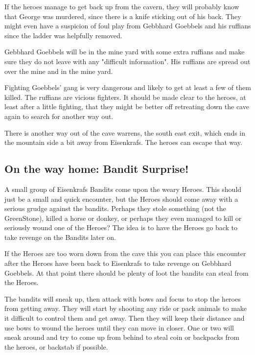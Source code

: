 \documentclass[11pt, twoside, titlepage, a4paper]{report}
\begin{document}
If the heroes manage to get back up from the cavern, they will probably know that George was murdered, since there is a knife sticking out of his back. They might even have a suspicion of foul play from Gebbhard Goebbels and his ruffians since the ladder was helpfully removed.

Gebbhard Goebbels will be in the mine yard with some extra ruffians and make sure they do not leave with any "difficult information". His ruffians are spread out over the mine and in the mine yard.

Fighting Goebbels' gang is very dangerous and likely to get at least a few of them killed. The ruffians are vicious fighters. It should be made clear to the heroes, at least after a little fighting, that they might be better off retreating down the cave again to search for another way out.

There is another way out of the cave warrens, the south east exit, which ends in the mountain side a bit away from Eisenkrafs. The heroes can escape that way.


\subsection*{On the way home: Bandit Surprise!}
A small group of Eisenkrafs Bandits come upon the weary Heroes. This should just be a small and quick encounter, but the Heroes should come away with a serious grudge against the bandits. Perhaps they stole something (not the GreenStone), killed a horse or donkey, or perhaps they even managed to kill or seriously wound one of the Heroes? The idea is to have the Heroes go back to take revenge on the Bandits later on.

If the Heroes are too worn down from the cave this you can place this encounter after the Heroes have been back to Eisenkrafs to take revenge on Gebbhard Goebbels. At that point there should be plenty of loot the bandits can steal from the Heroes.

The bandits will sneak up, then attack with bows and focus to stop the heroes from getting away. They will start by shooting any ride or pack animals to make it difficult to control them and get away. Then they will keep their distance and use bows to wound the heroes until they can move in closer.
One or two will sneak around and try to come up from behind to steal coin or backpacks from the heroes, or backstab if possible.
\end{document}
